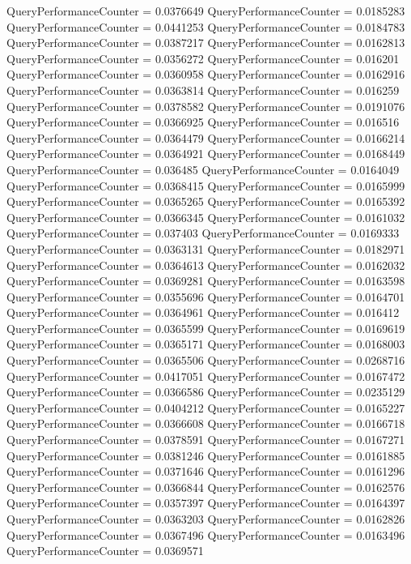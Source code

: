 \documentclass[9pt]{article}
\theoremstyle{plain}
\theoremstyle{definition}
\theoremstyle{remark}
\numberwithin{equation}{section}
\begin{document}
QueryPerformanceCounter  =  0.0376649
QueryPerformanceCounter  =  0.0185283
QueryPerformanceCounter  =  0.0441253
QueryPerformanceCounter  =  0.0184783
QueryPerformanceCounter  =  0.0387217
QueryPerformanceCounter  =  0.0162813
QueryPerformanceCounter  =  0.0356272
QueryPerformanceCounter  =  0.016201
QueryPerformanceCounter  =  0.0360958
QueryPerformanceCounter  =  0.0162916
QueryPerformanceCounter  =  0.0363814
QueryPerformanceCounter  =  0.016259
QueryPerformanceCounter  =  0.0378582
QueryPerformanceCounter  =  0.0191076
QueryPerformanceCounter  =  0.0366925
QueryPerformanceCounter  =  0.016516
QueryPerformanceCounter  =  0.0364479
QueryPerformanceCounter  =  0.0166214
QueryPerformanceCounter  =  0.0364921
QueryPerformanceCounter  =  0.0168449
QueryPerformanceCounter  =  0.036485
QueryPerformanceCounter  =  0.0164049
QueryPerformanceCounter  =  0.0368415
QueryPerformanceCounter  =  0.0165999
QueryPerformanceCounter  =  0.0365265
QueryPerformanceCounter  =  0.0165392
QueryPerformanceCounter  =  0.0366345
QueryPerformanceCounter  =  0.0161032
QueryPerformanceCounter  =  0.037403
QueryPerformanceCounter  =  0.0169333
QueryPerformanceCounter  =  0.0363131
QueryPerformanceCounter  =  0.0182971
QueryPerformanceCounter  =  0.0364613
QueryPerformanceCounter  =  0.0162032
QueryPerformanceCounter  =  0.0369281
QueryPerformanceCounter  =  0.0163598
QueryPerformanceCounter  =  0.0355696
QueryPerformanceCounter  =  0.0164701
QueryPerformanceCounter  =  0.0364961
QueryPerformanceCounter  =  0.016412
QueryPerformanceCounter  =  0.0365599
QueryPerformanceCounter  =  0.0169619
QueryPerformanceCounter  =  0.0365171
QueryPerformanceCounter  =  0.0168003
QueryPerformanceCounter  =  0.0365506
QueryPerformanceCounter  =  0.0268716
QueryPerformanceCounter  =  0.0417051
QueryPerformanceCounter  =  0.0167472
QueryPerformanceCounter  =  0.0366586
QueryPerformanceCounter  =  0.0235129
QueryPerformanceCounter  =  0.0404212
QueryPerformanceCounter  =  0.0165227
QueryPerformanceCounter  =  0.0366608
QueryPerformanceCounter  =  0.0166718
QueryPerformanceCounter  =  0.0378591
QueryPerformanceCounter  =  0.0167271
QueryPerformanceCounter  =  0.0381246
QueryPerformanceCounter  =  0.0161885
QueryPerformanceCounter  =  0.0371646
QueryPerformanceCounter  =  0.0161296
QueryPerformanceCounter  =  0.0366844
QueryPerformanceCounter  =  0.0162576
QueryPerformanceCounter  =  0.0357397
QueryPerformanceCounter  =  0.0164397
QueryPerformanceCounter  =  0.0363203
QueryPerformanceCounter  =  0.0162826
QueryPerformanceCounter  =  0.0367496
QueryPerformanceCounter  =  0.0163496
QueryPerformanceCounter  =  0.0369571
\end{document}
